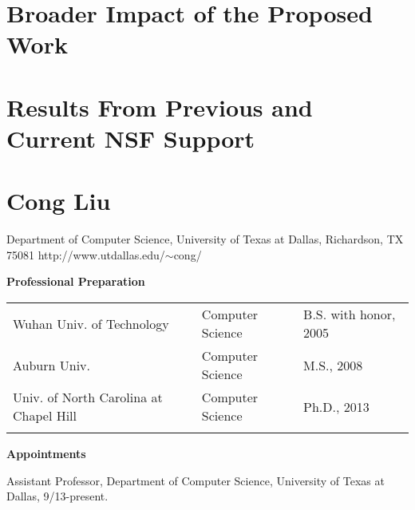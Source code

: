 \documentclass[10pt,letterpaper]{article}
\newcommand{\required}[1]{\section*{\hfil #1\hfil}}                    %
\begin{document}
\section{Broader Impact of the Proposed Work}
\label{sec:impact}




\section{Results From Previous and Current NSF Support}
\label{sec:prior} 


\newpage
{}

 



\newpage
{}
\thispagestyle{empty}

\required{Cong Liu}
\vspace{-3mm}
\begin{center}
Department of Computer Science, University of Texas at Dallas, Richardson, TX 75081
http://www.utdallas.edu/$\sim$cong/
\end{center}


\noindent \textbf{Professional Preparation}\

	\begin{tabular}{l l l}
		Wuhan Univ. of Technology &  Computer Science & B.S. with honor, 2005 \\
		Auburn Univ. & Computer Science & M.S., 2008 \\
		Univ. of North Carolina at Chapel Hill & Computer Science & Ph.D., 2013\\ \\
	\end{tabular}

\noindent \textbf{Appointments}\

	\hspace{1mm} Assistant Professor, Department of Computer Science, University of Texas at Dallas, 9/13-present. \\
	
\end{document}
